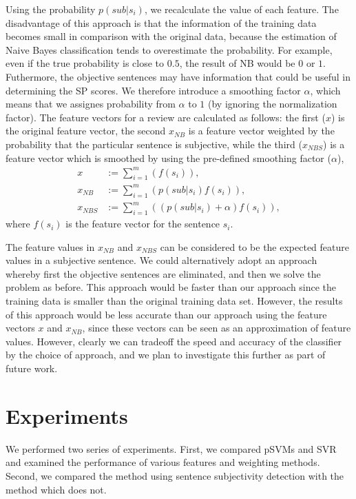 \documentclass[japanese]{jnlp_1.3d}
\begin{document}
Using the probability $p(sub|s_i)$, we recalculate the value of each feature. The disadvantage of this approach is that the information of the training data becomes small in comparison with the original data, because the estimation of Naive Bayes classification tends to overestimate the probability. For example, even if the true probability is close to $0.5$, the result of NB would be $0$ or $1$. Futhermore, the objective sentences may have information that could be useful in determining the SP scores. We therefore introduce a smoothing factor $\alpha$, which means that we assignes probability from $\alpha$ to $1$ (by ignoring the normalization factor). The feature vectors for a review are calculated as follows: the first ($x$) is the original feature vector, the second  $x_{NB}$ is a feature vector weighted by the probability that the particular sentence is subjective, while the third ($x_{NBS}$) is a feature vector which is smoothed by using the pre-defined smoothing factor ($\alpha$),
\begin{align}
x  & :=  \sum_{i=1}^{m}(f(s_i)), \label{Original} \\
x_{NB} & :=  \sum_{i=1}^{m}(p(sub|s_i)f(s_i)), \label{NBD} \\
x_{NBS} & :=  \sum_{i=1}^{m}((p(sub|s_i) + \alpha)f(s_i)) \label{NBD-added},
\end{align}
where $f(s_i)$ is the feature vector for the sentence $s_i$.

The  feature values in $x_{NB}$ and $x_{NBS}$ can be considered to be the expected feature values in a subjective sentence. We could alternatively adopt an approach \cite{Pang2004} whereby first the objective sentences are eliminated, and then we solve the problem as before. This approach would be faster than our approach since the training data is smaller than the original training data set. However, the results of this approach would be less accurate than our approach using the feature vectors $x$ and $x_{NB}$, since these vectors can be seen as an approximation of feature values. However, clearly we can tradeoff the speed and accuracy of the classifier by the choice of approach, and we plan to investigate this further as part of future work.



\section{Experiments}
\label{Experiments}
We performed two series of experiments. First, we compared pSVMs and SVR and examined the performance of various features and weighting methods. Second, we compared the method using sentence subjectivity detection with the method which does not.
\end{document}
